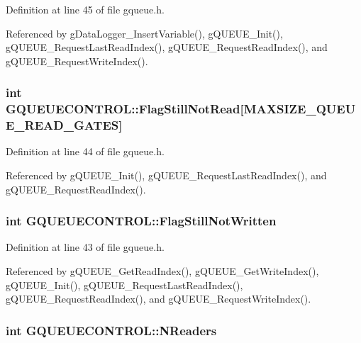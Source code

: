 Definition at line 45 of file gqueue.h.



Referenced by gDataLogger\_\-InsertVariable(), gQUEUE\_\-Init(), gQUEUE\_\-RequestLastReadIndex(), gQUEUE\_\-RequestReadIndex(), and gQUEUE\_\-RequestWriteIndex().

\hypertarget{structGQUEUECONTROL_a9336a08f0410235b38b78638b0e3f882}{
\subsubsection[{FlagStillNotRead}]{\setlength{\rightskip}{0pt plus 5cm}int {\bf GQUEUECONTROL::FlagStillNotRead}\mbox{[}MAXSIZE\_\-QUEUE\_\-READ\_\-GATES\mbox{]}}}
\label{structGQUEUECONTROL_a9336a08f0410235b38b78638b0e3f882}


Definition at line 44 of file gqueue.h.



Referenced by gQUEUE\_\-Init(), gQUEUE\_\-RequestLastReadIndex(), and gQUEUE\_\-RequestReadIndex().

\hypertarget{structGQUEUECONTROL_a4d58bdb6b0dc93bb6034c4209b6e7915}{
\subsubsection[{FlagStillNotWritten}]{\setlength{\rightskip}{0pt plus 5cm}int {\bf GQUEUECONTROL::FlagStillNotWritten}}}
\label{structGQUEUECONTROL_a4d58bdb6b0dc93bb6034c4209b6e7915}


Definition at line 43 of file gqueue.h.



Referenced by gQUEUE\_\-GetReadIndex(), gQUEUE\_\-GetWriteIndex(), gQUEUE\_\-Init(), gQUEUE\_\-RequestLastReadIndex(), gQUEUE\_\-RequestReadIndex(), and gQUEUE\_\-RequestWriteIndex().

\hypertarget{structGQUEUECONTROL_a790618cf693d7e4249fec2f5074b40e3}{
\subsubsection[{NReaders}]{\setlength{\rightskip}{0pt plus 5cm}int {\bf GQUEUECONTROL::NReaders}}}
\label{structGQUEUECONTROL_a790618cf693d7e4249fec2f5074b40e3}


